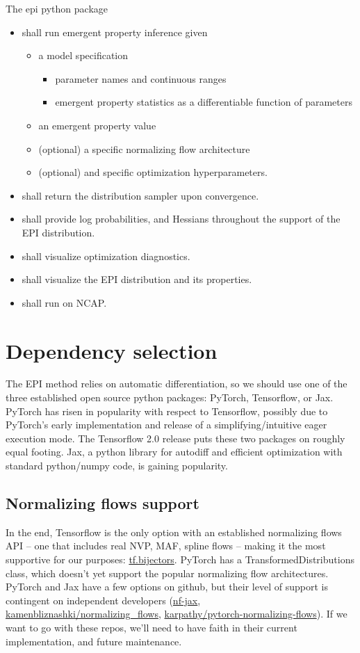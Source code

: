 \documentclass[11pt]{article}
\begin{document}
The epi python package
\begin{itemize}
\item shall run emergent property inference given
\begin{itemize}
\item a model specification
\begin{itemize}
\item parameter names and continuous ranges
\item emergent property statistics as a differentiable function of parameters
\end{itemize}
\item an emergent property value
\item (optional) a specific normalizing flow architecture 
\item (optional) and specific optimization hyperparameters.
\end{itemize}
\item shall return the distribution sampler upon convergence.
\item shall provide log probabilities, and Hessians throughout the support of the EPI distribution.
\item shall visualize optimization diagnostics.
\item shall visualize the EPI distribution and its properties.
\item shall run on NCAP.
\end{itemize}

\section{Dependency selection}
The EPI method relies on automatic differentiation, so we should use one of the three established open source python packages: PyTorch, Tensorflow, or Jax.
PyTorch has risen in popularity with respect to Tensorflow, possibly due to PyTorch's early implementation and release of a simplifying/intuitive eager execution mode.
The Tensorflow 2.0 release puts these two packages on roughly equal footing.
Jax, a python library for autodiff and efficient optimization with standard python/numpy code, is gaining popularity.

\subsection{Normalizing flows support}
In the end, Tensorflow is the only option with an established normalizing flows API -- one that includes real NVP, MAF, spline flows -- making it the most supportive for our purposes: \href{https://www.tensorflow.org/probability/api_docs/python/tfp/bijectors/Bijector}{tf.bijectors}.
PyTorch has a TransformedDistributions class, which doesn't yet support the popular normalizing flow architectures.
PyTorch and Jax have a few options on github, but their level of support is contingent on independent developers (\href{https://github.com/ericjang/nf-jax}{nf-jax}, \href{https://github.com/kamenbliznashki/normalizing_flows}{kamenbliznashki/normalizing\_flows}, \href{https://github.com/karpathy/pytorch-normalizing-flows}{karpathy/pytorch-normalizing-flows}).  If we want to go with these repos, we'll need to have faith in their current implementation, and future maintenance.
\end{document}
